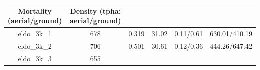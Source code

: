 \documentclass[]{article}
\begin{document}
\begin{longtable}[]{@{}cccccc@{}}
\begin{minipage}[b]{0.17\columnwidth}
Mortality (aerial/ground)\strut
\end{minipage} & \begin{minipage}[b]{0.22\columnwidth}\centering\strut
Density (tpha; aerial/ground)\strut
\end{minipage}\tabularnewline
\midrule
\endhead
\begin{minipage}[t]{0.12\columnwidth}\centering\strut
eldo\_3k\_1\strut
\end{minipage} & \begin{minipage}[t]{0.07\columnwidth}\centering\strut
678\strut
\end{minipage} & \begin{minipage}[t]{0.12\columnwidth}\centering\strut
0.319\strut
\end{minipage} & \begin{minipage}[t]{0.14\columnwidth}\centering\strut
31.02\strut
\end{minipage} & \begin{minipage}[t]{0.17\columnwidth}\centering\strut
0.11/0.61\strut
\end{minipage} & \begin{minipage}[t]{0.22\columnwidth}\centering\strut
630.01/410.19\strut
\end{minipage}\tabularnewline
\begin{minipage}[t]{0.12\columnwidth}\centering\strut
eldo\_3k\_2\strut
\end{minipage} & \begin{minipage}[t]{0.07\columnwidth}\centering\strut
706\strut
\end{minipage} & \begin{minipage}[t]{0.12\columnwidth}\centering\strut
0.501\strut
\end{minipage} & \begin{minipage}[t]{0.14\columnwidth}\centering\strut
30.61\strut
\end{minipage} & \begin{minipage}[t]{0.17\columnwidth}\centering\strut
0.12/0.36\strut
\end{minipage} & \begin{minipage}[t]{0.22\columnwidth}\centering\strut
444.26/647.42\strut
\end{minipage}\tabularnewline
\begin{minipage}[t]{0.12\columnwidth}\centering\strut
eldo\_3k\_3\strut
\end{minipage} & \begin{minipage}[t]{0.07\columnwidth}\centering\strut
655\strut
\end{minipage} & \begin{minipage}[t]{0.12\columnwidth}\centering\strut

\end{minipage}
\end{longtable}
\end{document}
